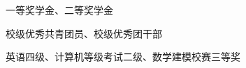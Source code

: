 \vspace{-4.0mm}

\begin{cventries}
\vspace{-1.5mm}
\cvpapers
{
    \begin{cvitems}
    \item {一等奖学金、二等奖学金}
    \item {校级优秀共青团员、校级优秀团干部}
    \item {英语四级、计算机等级考试二级、数学建模校赛三等奖}
    \end{cvitems}
}
\end{cventries}
